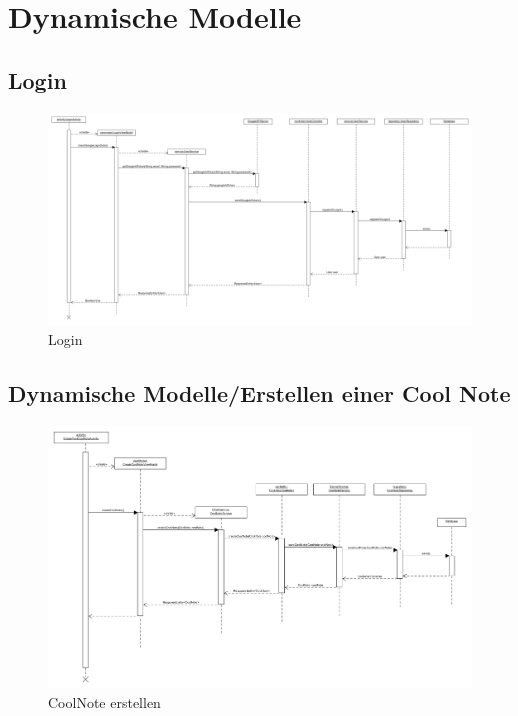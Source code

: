 \documentclass[a4paper]{scrreprt}
\begin{document}
\chapter{Dynamische Modelle}
		\section{Login}
		 \begin{figure}[H]
	       \centering
	       \includegraphics[angle=90,scale = .28]{login_sequenzdiagramm.png}
	       \caption{Login}
	      \end{figure}
	      
	      	
	 
	 
		\section{Dynamische Modelle/Erstellen einer Cool Note}
		 \begin{figure}[H]
	       \centering
	       \includegraphics[scale = .35]{SD_CoolNote_erstellen.png}
	       \caption{CoolNote erstellen}
	      \end{figure}
	      
\end{document}
